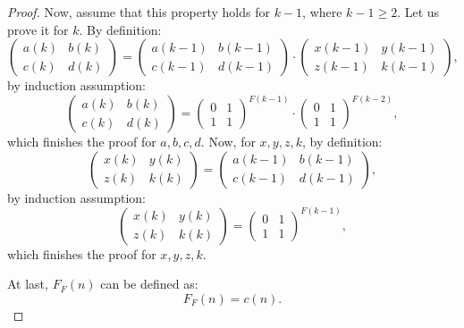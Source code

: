\documentclass[12pt]{article}
\theoremstyle{definition}
\begin{document}
\begin{proof}
    Now, assume that this property holds for $k-1$, where $k-1 \geq 2$. Let us prove it for $k$. By definition:
    $$
    \begin{pmatrix}
        a(k) & b(k)\\ 
        c(k) & d(k)
    \end{pmatrix} =
    \begin{pmatrix}
        a(k-1) & b(k-1)\\ 
        c(k-1) & d(k-1)
    \end{pmatrix} 
    \cdot
    \begin{pmatrix}
        x(k-1) & y(k-1)\\ 
        z(k-1) & k(k-1)
    \end{pmatrix},
    $$
    by induction assumption:
    $$
    \begin{pmatrix}
        a(k) & b(k)\\ 
        c(k) & d(k)
    \end{pmatrix} =
    \begin{pmatrix}
        0 & 1\\ 
        1 & 1
    \end{pmatrix}^{F(k-1)}
    \cdot
    \begin{pmatrix}
        0 & 1\\ 
        1 & 1
    \end{pmatrix}^{F(k-2)},
    $$
    which finishes the proof for $a,b,c,d$. Now, for $x,y,z,k$, by definition:
    $$
    \begin{pmatrix}
        x(k) & y(k)\\ 
        z(k) & k(k)
    \end{pmatrix} =
    \begin{pmatrix}
        a(k-1) & b(k-1)\\ 
        c(k-1) & d(k-1)
    \end{pmatrix},
    $$
    by induction assumption:
    $$
    \begin{pmatrix}
        x(k) & y(k)\\ 
        z(k) & k(k)
    \end{pmatrix} =
    \begin{pmatrix}
        0 & 1\\ 
        1 & 1
    \end{pmatrix}^{F(k-1)},
    $$
    which finishes the proof for $x,y,z,k$.

    At last, $F_F(n)$ can be defined as:
    $$F_F(n) = c(n).$$
\end{proof}
\end{document}
